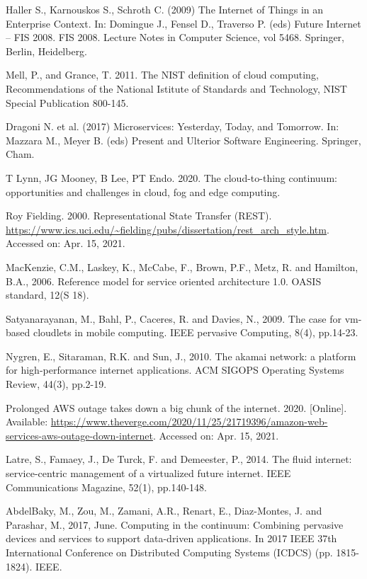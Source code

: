 \documentclass{ieeeaccess}
\begin{document}
\begin{thebibliography}{00}

 Haller S., Karnouskos S., Schroth C. (2009) The Internet of Things in an Enterprise Context. In: Domingue J., Fensel D., Traverso P. (eds) Future Internet – FIS 2008. FIS 2008. Lecture Notes in Computer Science, vol 5468. Springer, Berlin, Heidelberg.

 Mell, P., and Grance, T. 2011. The NIST definition of cloud computing, Recommendations of the National Istitute of Standards and Technology, NIST Special Publication 800-145.

 Dragoni N. et al. (2017) Microservices: Yesterday, Today, and Tomorrow. In: Mazzara M., Meyer B. (eds) Present and Ulterior Software Engineering. Springer, Cham.

 T Lynn, JG Mooney, B Lee, PT Endo. 2020. The cloud-to-thing continuum: opportunities and challenges in cloud, fog and edge computing.

 Roy Fielding. 2000. Representational State Transfer (REST). \url{https://www.ics.uci.edu/~fielding/pubs/dissertation/rest\_arch\_style.htm}. Accessed on: Apr. 15, 2021.

 MacKenzie, C.M., Laskey, K., McCabe, F., Brown, P.F., Metz, R. and Hamilton, B.A., 2006. Reference model for service oriented architecture 1.0. OASIS standard, 12(S 18).

 Satyanarayanan, M., Bahl, P., Caceres, R. and Davies, N., 2009. The case for vm-based cloudlets in mobile computing. IEEE pervasive Computing, 8(4), pp.14-23.

 Nygren, E., Sitaraman, R.K. and Sun, J., 2010. The akamai network: a platform for high-performance internet applications. ACM SIGOPS Operating Systems Review, 44(3), pp.2-19.

 Prolonged AWS outage takes down a big chunk of the internet. 2020. [Online]. Available: \url{https://www.theverge.com/2020/11/25/21719396/amazon-web-services-aws-outage-down-internet}. Accessed on: Apr. 15, 2021.

 Latre, S., Famaey, J., De Turck, F. and Demeester, P., 2014. The fluid internet: service-centric management of a virtualized future internet. IEEE Communications Magazine, 52(1), pp.140-148.

 AbdelBaky, M., Zou, M., Zamani, A.R., Renart, E., Diaz-Montes, J. and Parashar, M., 2017, June. Computing in the continuum: Combining pervasive devices and services to support data-driven applications. In 2017 IEEE 37th International Conference on Distributed Computing Systems (ICDCS) (pp. 1815-1824). IEEE.


\end{thebibliography}
\end{document}
